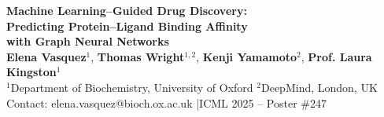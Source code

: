 \documentclass[a0paper,portrait]{article}
\begin{document}

\vspace*{-1cm}
\begin{center}
  {\color{white}\fontsize{72}{86}\selectfont\bfseries
  Machine Learning--Guided Drug Discovery:\\[0.3cm]
  Predicting Protein--Ligand Binding Affinity\\[0.3cm]
  with Graph Neural Networks}\\[1.5cm]
  {\color{white}\fontsize{36}{44}\selectfont
  \textbf{Elena Vasquez}$^1$, \textbf{Thomas Wright}$^{1,2}$, \textbf{Kenji Yamamoto}$^2$, \textbf{Prof. Laura Kingston}$^1$}\\[0.8cm]
  {\color{white!85}\fontsize{30}{36}\selectfont
  $^1$Department of Biochemistry, University of Oxford \quad\quad
  $^2$DeepMind, London, UK}\\[0.5cm]
  {\color{accentblue!40}\fontsize{26}{32}\selectfont
  Contact: elena.vasquez@bioch.ox.ac.uk \quad|\quad ICML 2025 -- Poster \#247}
\end{center}

\vspace{2cm}
\end{document}
